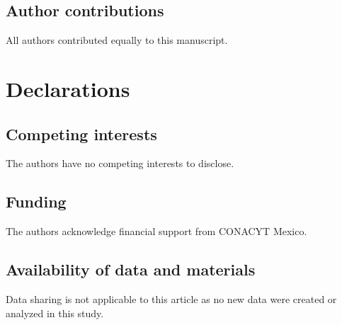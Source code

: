 \documentclass[12,english]{amsart}
\theoremstyle{plain}
\theoremstyle{definition}
\theoremstyle{plain}
\theoremstyle{plain}
\theoremstyle{remark}
\begin{document}
\subsection*{Author contributions} All authors contributed equally to this manuscript.

\section{Declarations}
\subsection*{Competing interests}
The authors have no competing interests to disclose.
\subsection*{Funding}
The authors acknowledge financial support from CONACYT Mexico.
\subsection*{Availability of data and materials}
Data sharing is not applicable to this article as no new data were created or analyzed in this study.

%
%
\end{document}
